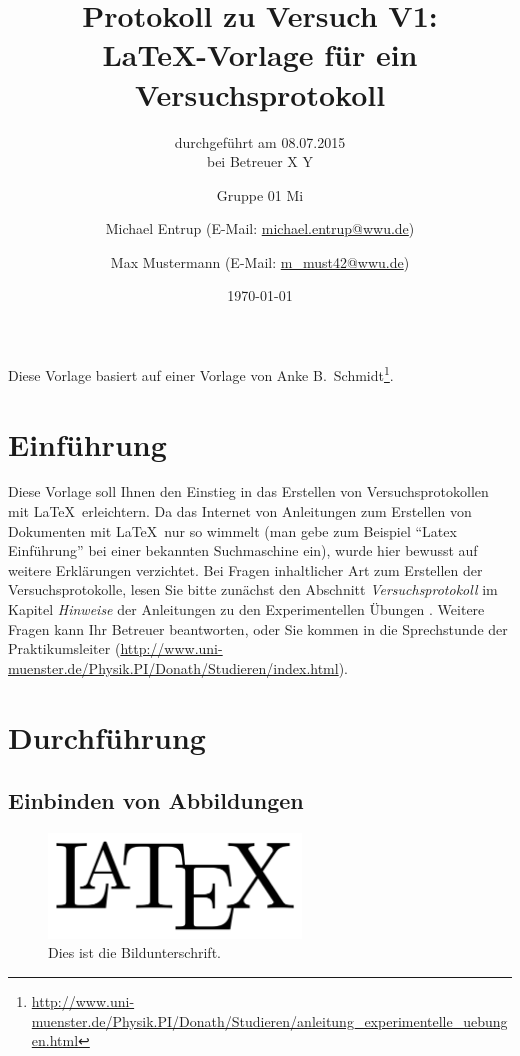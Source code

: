 \documentclass[
	fontsize=11pt,
	paper=a4,
	pagesize=auto,
	parskip=half,
	titlepage=on,
	ngerman
]{scrartcl}
\begin{document}
\title{
	Protokoll zu Versuch V1:\\
	\LaTeX-Vorlage für ein Versuchsprotokoll
}
\subtitle{
	durchgeführt am 08.07.2015\\
	bei Betreuer X Y
}
\author{
	Gruppe 01 Mi\and
	Michael Entrup (E-Mail: \url{michael.entrup@wwu.de}) \and
	Max Mustermann (E-Mail: \url{m_must42@wwu.de})
}
\date{\today}

\maketitle

\newpage

\tableofcontents

\newpage

Diese Vorlage basiert auf einer Vorlage von Anke B.\ Schmidt\footnote{\url{http://www.uni-muenster.de/Physik.PI/Donath/Studieren/anleitung_experimentelle_uebungen.html}}.

\section{Einführung}

Diese Vorlage soll Ihnen den Einstieg in das Erstellen von Versuchsprotokollen mit \LaTeX\ erleichtern. Da das Internet von Anleitungen zum Erstellen von Dokumenten mit \LaTeX\ nur so wimmelt (man gebe zum Beispiel ``Latex Einführung'' bei einer bekannten Suchmaschine ein), wurde hier bewusst auf weitere Erklärungen verzichtet. Bei Fragen inhaltlicher Art zum Erstellen der Versuchsprotokolle, lesen Sie bitte zunächst den Abschnitt \emph{Versuchsprotokoll} im Kapitel \emph{Hinweise} der Anleitungen zu den Experimentellen Übungen \cite{anleitung}. Weitere Fragen kann Ihr Betreuer beantworten, oder Sie kommen in die Sprechstunde der Praktikumsleiter (\url{http://www.uni-muenster.de/Physik.PI/Donath/Studieren/index.html}).

\section{Durchführung}

\subsection{Einbinden von Abbildungen}

\begin{figure}[htb]
	\centering
	\includegraphics[width=0.6\textwidth]{Bild}
	\caption{Dies ist die Bildunterschrift.}\label{Bild}
\end{figure}
\end{document}

